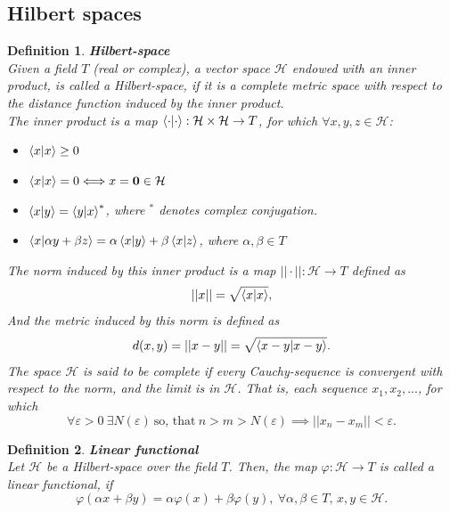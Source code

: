 \documentclass[12pt, a4paper,  nobibnotes]{article}
\newcommand{\bb}[1]{\mathbf{#1}}
\newtheorem{definition}{Definition}
\begin{document}
\subsection{Hilbert spaces}
\begin{definition}
    \textbf{Hilbert-space}\\
    Given a field $T$ (real or complex), a vector space $\mathcal H$ endowed with an inner product, is called a Hilbert-space, if
    it is a complete metric space with respect to the distance function induced by the inner product.
    \\
    The inner product is a map $\braket{\cdot|\cdot}:\mathcal{H}\times\mathcal{H} \rightarrow T$, 
    for which $\forall x,y,z \in \mathcal H$:
    \begin{itemize}
        \item $\braket{x|x} \geq 0$
        \item $\braket{x|x} = 0 \Longleftrightarrow x = \bb 0 \in \mathcal H$
        \item $\braket{x|y} = \braket{y|x}^*$, where $^*$ denotes complex conjugation.
        \item $\braket{x|\alpha y + \beta z} = \alpha\braket{x|y} + \beta\braket{x|z}$, where $\alpha, \beta \in T$
    \end{itemize}
    The norm induced by this inner product is a map $||\cdot||:\mathcal H \rightarrow T$ defined as
    \begin{equation*}
        ||x||=\sqrt{\braket{x|x}},
    \end{equation*}
    And the metric induced by this norm is defined as
    \begin{equation*}
        d(x,y) = ||x - y|| = \sqrt{\braket{x - y|x - y}}.
    \end{equation*}
    The space $\mathcal H$ is said to be complete if every Cauchy-sequence is convergent with respect to the norm, and
    the limit is in $\mathcal H$. That is, each sequence ${x_1, x_2, ... }$, for which 
    \begin{equation*}
        \forall \varepsilon > 0 ~ \exists N(\varepsilon) ~\textrm{so, that}~ n>m>N(\varepsilon) \implies ||x_n - x_m||<\varepsilon.
    \end{equation*}
\end{definition} 

\begin{definition}
    \textbf{Linear functional}\\
    Let $\mathcal H$ be a Hilbert-space over the field $T$. Then, the map $\varphi:\mathcal H \rightarrow T$ is  
    called a linear functional, if
    \begin{equation*}
        \varphi(\alpha x + \beta y) = \alpha \varphi(x) + \beta \varphi(y),~
        \forall \alpha, \beta \in T,\, x, y \in \mathcal H.
    \end{equation*}
\end{definition}
\end{document}
